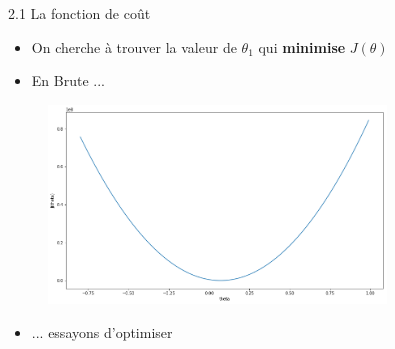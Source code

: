 \begin{frame}{2.1 La fonction de coût}
  \begin{itemize}
  \item On cherche à trouver la valeur de $\theta_{1}$ qui \textbf{minimise} $J(\theta)$
    \vspace{0.2cm}
  \item En Brute ...
  \end{itemize}
  \vspace{-0.5cm}
  \begin{figure}
    \includegraphics[width=0.8\textwidth]{fig/costFct.png}
  \end{figure}
  \vspace{-0.5cm}
  \begin{itemize}
  \item ... essayons d'optimiser
  \end{itemize}
\end{frame}

